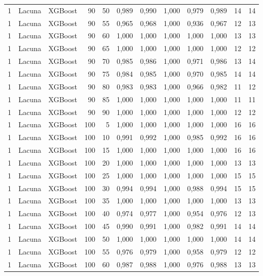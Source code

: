 \begin{longtable}{@{}rllrrrrrrrrr@{}}
1 & Lacuna & XGBoost & 90 & 50 & 0,989 & 0,990 & 1,000 & 0,979 & 0,989 & 14 & 14 \\
1 & Lacuna & XGBoost & 90 & 55 & 0,965 & 0,968 & 1,000 & 0,936 & 0,967 & 12 & 13 \\
1 & Lacuna & XGBoost & 90 & 60 & 1,000 & 1,000 & 1,000 & 1,000 & 1,000 & 13 & 13 \\
1 & Lacuna & XGBoost & 90 & 65 & 1,000 & 1,000 & 1,000 & 1,000 & 1,000 & 12 & 12 \\
1 & Lacuna & XGBoost & 90 & 70 & 0,985 & 0,986 & 1,000 & 0,971 & 0,986 & 13 & 14 \\
1 & Lacuna & XGBoost & 90 & 75 & 0,984 & 0,985 & 1,000 & 0,970 & 0,985 & 14 & 14 \\
1 & Lacuna & XGBoost & 90 & 80 & 0,983 & 0,983 & 1,000 & 0,966 & 0,982 & 11 & 12 \\
1 & Lacuna & XGBoost & 90 & 85 & 1,000 & 1,000 & 1,000 & 1,000 & 1,000 & 11 & 11 \\
1 & Lacuna & XGBoost & 90 & 90 & 1,000 & 1,000 & 1,000 & 1,000 & 1,000 & 12 & 12 \\
1 & Lacuna & XGBoost & 100 & 5 & 1,000 & 1,000 & 1,000 & 1,000 & 1,000 & 16 & 16 \\
1 & Lacuna & XGBoost & 100 & 10 & 0,991 & 0,992 & 1,000 & 0,985 & 0,992 & 16 & 16 \\
1 & Lacuna & XGBoost & 100 & 15 & 1,000 & 1,000 & 1,000 & 1,000 & 1,000 & 16 & 16 \\
1 & Lacuna & XGBoost & 100 & 20 & 1,000 & 1,000 & 1,000 & 1,000 & 1,000 & 13 & 13 \\
1 & Lacuna & XGBoost & 100 & 25 & 1,000 & 1,000 & 1,000 & 1,000 & 1,000 & 15 & 15 \\
1 & Lacuna & XGBoost & 100 & 30 & 0,994 & 0,994 & 1,000 & 0,988 & 0,994 & 15 & 15 \\
1 & Lacuna & XGBoost & 100 & 35 & 1,000 & 1,000 & 1,000 & 1,000 & 1,000 & 13 & 13 \\
1 & Lacuna & XGBoost & 100 & 40 & 0,974 & 0,977 & 1,000 & 0,954 & 0,976 & 12 & 13 \\
1 & Lacuna & XGBoost & 100 & 45 & 0,990 & 0,991 & 1,000 & 0,982 & 0,991 & 14 & 14 \\
1 & Lacuna & XGBoost & 100 & 50 & 1,000 & 1,000 & 1,000 & 1,000 & 1,000 & 14 & 14 \\
1 & Lacuna & XGBoost & 100 & 55 & 0,976 & 0,979 & 1,000 & 0,958 & 0,979 & 12 & 12 \\
1 & Lacuna & XGBoost & 100 & 60 & 0,987 & 0,988 & 1,000 & 0,976 & 0,988 & 13 & 13 \\

\end{longtable}
